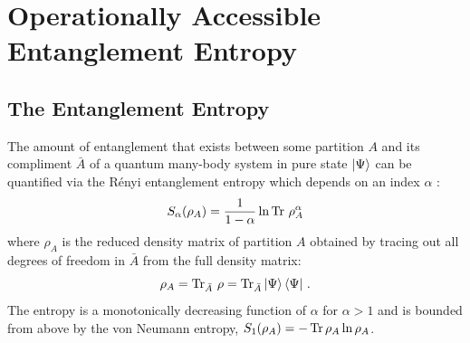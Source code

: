 \section{Operationally Accessible Entanglement Entropy}

\subsection{The \ren Entanglement Entropy}
\label{sec:accEntanglementIntro}

The amount of entanglement that exists between some partition $A$ and its compliment $\bar{A}$ of a quantum many-body system in pure state $\ket{\Psi}$ can be quantified via the R\'{e}nyi entanglement entropy which depends on an index $\alpha$ :
%
\begin{equation}
S_{\alpha} (\rho_A) = \frac{1}{1-\alpha}\ln \operatorname{Tr}\, \rho_A^{\alpha}
\label{eq:S_alpha}
\end{equation}
%
where $\rho_{A}$ is the reduced density matrix of partition $A$ obtained by
tracing out all degrees of freedom in $\bar{A}$ from the full density matrix:
%
\begin{equation}
\rho_{A} = \operatorname{Tr}_{\bar{A}}\, \rho = \operatorname{Tr}_{\bar{A}} \ket{\Psi}\bra{\Psi}\,.
\end{equation}
%
The \ren entropy is a monotonically decreasing function of $\alpha$ for $\alpha
> 1$ and is bounded from above by the von Neumann entropy, $S_1(\rho_A) = -\operatorname{Tr} \rho_A \ln \rho_A$.

